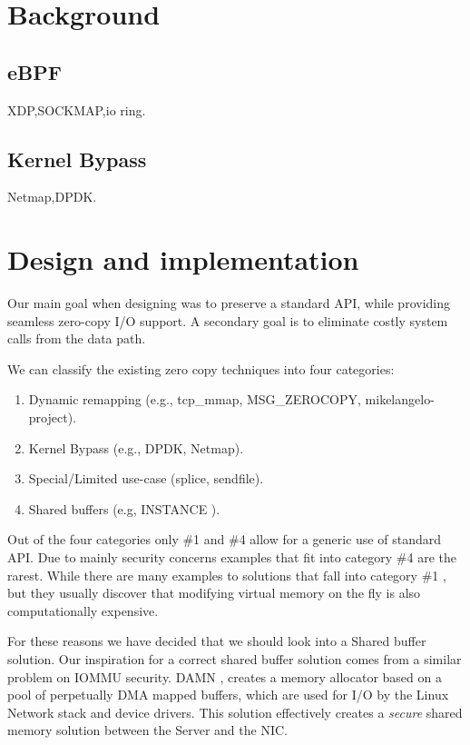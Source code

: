 \section{Background}
\subsection{eBPF}
XDP,SOCKMAP,io ring.
\subsection{Kernel Bypass}
Netmap,DPDK.

\section{Design and implementation}
Our main goal when designing \oursys was to preserve a standard \sockets API, while providing seamless zero-copy I/O support. A secondary goal is to eliminate costly system calls from the data path. 

We can classify the existing zero copy techniques into four categories:
\begin{enumerate}
    \item Dynamic remapping (e.g., tcp\_mmap, MSG\_ZEROCOPY, mikelangelo-project\cite{mikelangelo}).
    \item Kernel Bypass (e.g., DPDK, Netmap\cite{rizzo2012netmap}).
    \item Special/Limited use-case (splice, sendfile).
    \item Shared buffers (e.g, INSTANCE \cite{instance}).
\end{enumerate}
Out of the four categories only \#1 and \#4 allow for a generic use of standard \sockets API. Due to mainly security concerns examples that fit into category \#4 are the rarest.
While there are many examples to solutions that fall into category \#1 \cite{mikelangelo-empty,desendmsg}, but they usually discover that modifying virtual memory on the fly is also computationally expensive. 

For these reasons we have decided that we should look into a Shared buffer solution. Our inspiration for a correct shared buffer solution comes from a similar problem on IOMMU security. DAMN \cite{markuze2018damn}, creates a memory allocator based on a pool of perpetually DMA mapped buffers, which are used for I/O by the Linux Network stack and device drivers. This solution effectively creates a \emph{secure} shared memory solution between the Server and the NIC.

